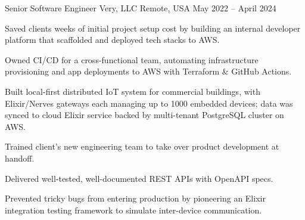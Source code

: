 
\begin{cventries}

	\cventry
	{Senior Software Engineer} %
	{Very, LLC} %
	{Remote, USA} %
	{May 2022 -- April 2024} %
	{
		\begin{cvitems}
			\item Saved clients weeks of initial project setup cost by building an
			internal developer platform that scaffolded and deployed tech stacks to
			AWS.
			\item Owned CI/CD for a cross-functional team, automating infrastructure
			provisioning and app deployments to AWS with Terraform \& GitHub
			Actions.
			\item Built local-first distributed IoT system for commercial buildings,
			with Elixir/Nerves gateways each managing up to 1000 embedded devices;
			data was synced to cloud Elixir service backed by multi-tenant PostgreSQL
			cluster on AWS.
			\item Trained client's new engineering team to take over product
			development at handoff.
			\item Delivered well-tested, well-documented REST APIs with OpenAPI specs.
			\item Prevented tricky bugs from entering production by pioneering an
			Elixir integration testing framework to simulate inter-device
			communication.

\end{cvitems}}
\end{cventries}
